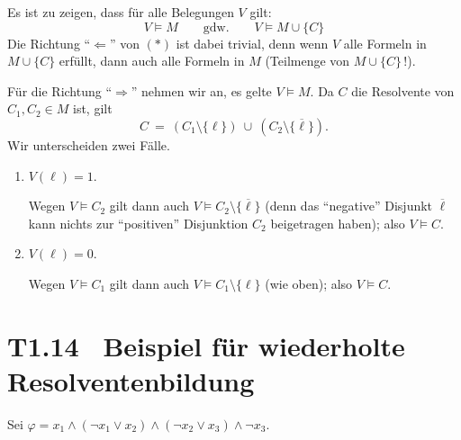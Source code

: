 \documentclass[fontsize=11pt, twoside=false, numbers=autoenddot]{scrbook}
\begin{document}
\par\noindent
\begin{beweis}
  Es ist zu zeigen, dass für alle Belegungen $V$ gilt:
  \begin{equation*}
    \tag{$*$}
    V \models M
    \qquad\text{gdw.}\qquad
    V \models M \cup \{C\}
  \end{equation*}
  Die Richtung "`$\Leftarrow$"' von $(*)$ ist dabei trivial,
  denn wenn $V$ alle Formeln in $M \cup \{C\}$ erfüllt,
  dann auch alle Formeln in $M$ (Teilmenge von $M \cup \{C\}$\,!).

  Für die Richtung "`$\Rightarrow$"' nehmen wir an, es gelte $V \models M$.
  Da $C$ die Resolvente von $C_1,C_2 \in M$ ist, gilt
  \[
    C ~=~ (C_1 \setminus \{\ell\}) ~\cup~ (C_2 \setminus \{\overline\ell\}).
  \]
  Wir unterscheiden zwei Fälle.
  \begin{enumerate}
    \item
      $V(\ell) = 1$.
      \par\smallskip
      Wegen $V \models C_2$ gilt dann auch $V \models C_2 \setminus \{\overline\ell\}$
      (denn das "`negative"' Disjunkt $\overline\ell$ kann nichts zur "`positiven"' Disjunktion $C_2$ beigetragen haben);
      also $V \models C$.
      \par\smallskip
    \item
      $V(\ell) = 0$.
      \par\smallskip
      Wegen $V \models C_1$ gilt dann auch $V \models C_1 \setminus \{\ell\}$
      (wie oben);
      also $V \models C$.\qedhere
  \end{enumerate}
\end{beweis}%

\section*{T1.14~ Beispiel für wiederholte Resolventenbildung}

Sei
$\varphi = x_1 \wedge (\neg x_1 \vee x_2) \wedge (\neg x_2 \vee x_3) \wedge \neg x_3$.
\end{document}
